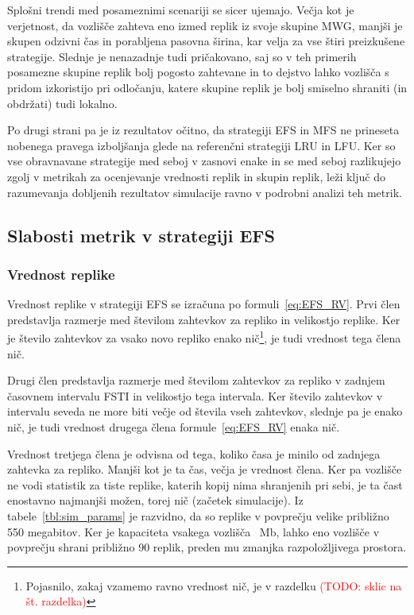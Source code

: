 \documentclass[a4paper, 12pt]{book}
\newcommand{\TODO}[1]{\textcolor{red}{(TODO: #1)}}
\begin{document}
Splošni trendi med posameznimi scenariji se sicer ujemajo. Večja kot je
verjetnost, da vozlišče zahteva eno izmed replik iz svoje skupine MWG, manjši
je skupen odzivni čas in porabljena pasovna širina, kar velja za vse štiri
preizkušene strategije. Slednje je nenazadnje tudi pričakovano, saj so v teh
primerih posamezne skupine replik bolj pogosto zahtevane in to dejstvo lahko
vozlišča s pridom izkoristijo pri odločanju, katere skupine replik je bolj
smiselno shraniti (in obdržati) tudi lokalno.

Po drugi strani pa je iz rezultatov očitno, da strategiji EFS in MFS ne
prineseta nobenega pravega izboljšanja glede na referenčni strategiji LRU in
LFU. Ker so vse obravnavane strategije med seboj v zasnovi enake in se med
seboj razlikujejo zgolj v metrikah za ocenjevanje vrednosti replik in skupin
replik, leži ključ do razumevanja dobljenih rezultatov simulacije ravno v
podrobni analizi teh metrik.


\subsection{Slabosti metrik v strategiji EFS}

\subsubsection{Vrednost replike}

Vrednost replike v strategiji EFS se izračuna po formuli~\eqref{eq:EFS_RV}.
Prvi člen predstavlja razmerje med številom zahtevkov za repliko in velikostjo
replike. Ker je število zahtevkov za vsako novo repliko enako nič\footnote{%
Pojasnilo, zakaj vzamemo ravno vrednost nič, je v razdelku \TODO{sklic na
št. razdelka}}, je tudi vrednost tega člena nič.

Drugi člen predstavlja razmerje med številom zahtevkov za repliko v zadnjem
časovnem intervalu FSTI in velikostjo tega intervala. Ker število zahtevkov
v intervalu seveda ne more biti večje od števila vseh zahtevkov,
slednje pa je enako nič, je tudi vrednost drugega člena
formule~\eqref{eq:EFS_RV} enaka nič.

Vrednost tretjega člena je odvisna od tega, koliko časa je minilo
od zadnjega zahtevka za repliko. Manjši kot je ta čas, večja je vrednost člena.
Ker pa vozlišče ne vodi statistik za tiste replike, katerih kopij nima
shranjenih pri sebi, je ta čast enostavno najmanjši možen, torej nič (začetek
simulacije). Iz tabele~\ref{tbl:sim_params} je razvidno, da so replike v
povprečju velike približno 550 megabitov. Ker je kapaciteta vsakega vozlišča
~Mb, lahko eno vozlišče v povprečju shrani približno 90
replik, preden mu zmanjka razpoložljivega prostora.
\end{document}
